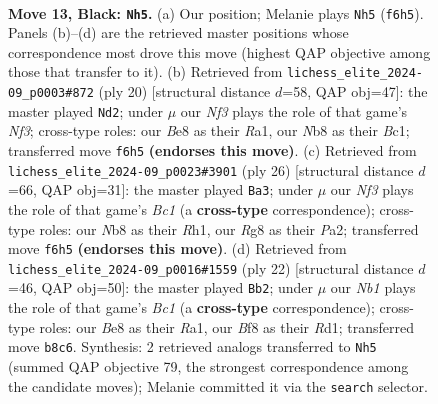 \documentclass[11pt]{article}
\begin{document}
\begin{figure}[p]
\label{fig:thought-m23}
\end{figure}

\clearpage

\begin{figure}[p]\centering
\begin{subfigure}{0.46\textwidth}\centering
\resizebox{\linewidth}{!}{%
\newchessgame
\chessboard[
  setfen={rn2bbr1/1p2kppp/p3pn2/2P5/P1B5/2NNPP2/1P4PP/R1B2RK1 b - - 2 13},
  showmover=false,
  pgfstyle=straightmove, color=movearrow, markmove={f6-h5}
]}
\caption{}
\end{subfigure}\hfill
\begin{subfigure}{0.46\textwidth}\centering
\resizebox{\linewidth}{!}{%
\newchessgame
\chessboard[
  setfen={rnb4r/4kppp/p3pn2/1pb5/8/2N1PN2/PP2BPPP/R1B2RK1 w - - 0 11},
  showmover=false,
  pgfstyle=straightmove, color=movearrow, markmove={f3-d2}
]}
\caption{}
\end{subfigure}
\\[4pt]
\begin{subfigure}{0.46\textwidth}\centering
\resizebox{\linewidth}{!}{%
\newchessgame
\chessboard[
  setfen={r1bbk2r/pp2nppp/2pn4/3p4/5NP1/1PP2N2/P2PBP1P/R1B1K2R w KQkq - 1 14},
  showmover=false,
  pgfstyle=straightmove, color=movearrow, markmove={c1-a3}
]}
\caption{}
\end{subfigure}\hfill
\begin{subfigure}{0.46\textwidth}\centering
\resizebox{\linewidth}{!}{%
\newchessgame
\chessboard[
  setfen={r1b2rk1/5ppp/p1n1pn2/1pb5/8/1PN1PN2/P3BPPP/R1BR2K1 w - - 2 12},
  showmover=false,
  pgfstyle=straightmove, color=movearrow, markmove={c1-b2}
]}
\caption{}
\end{subfigure}
\caption{\textbf{Move 13, Black: \texttt{Nh5}.} (a) Our position; Melanie plays \texttt{Nh5} (\texttt{f6h5}). Panels (b)--(d) are the retrieved master positions whose correspondence most drove this move (highest QAP objective among those that transfer to it). (b) Retrieved from \texttt{lichess\_elite\_2024-09\_p0003\#872} (ply 20) [structural distance $d$=58, QAP obj=47]: the master played \texttt{Nd2}; under $\mu$ our \emph{Nf3} plays the role of that game's \emph{Nf3}; cross-type roles: our \emph{B}e8 as their \emph{R}a1, our \emph{N}b8 as their \emph{B}c1; transferred move \texttt{f6h5} \textbf{(endorses this move)}. (c) Retrieved from \texttt{lichess\_elite\_2024-09\_p0023\#3901} (ply 26) [structural distance $d$=66, QAP obj=31]: the master played \texttt{Ba3}; under $\mu$ our \emph{Nf3} plays the role of that game's \emph{Bc1} (a \textbf{cross-type} correspondence); cross-type roles: our \emph{N}b8 as their \emph{R}h1, our \emph{R}g8 as their \emph{P}a2; transferred move \texttt{f6h5} \textbf{(endorses this move)}. (d) Retrieved from \texttt{lichess\_elite\_2024-09\_p0016\#1559} (ply 22) [structural distance $d$=46, QAP obj=50]: the master played \texttt{Bb2}; under $\mu$ our \emph{Nb1} plays the role of that game's \emph{Bc1} (a \textbf{cross-type} correspondence); cross-type roles: our \emph{B}e8 as their \emph{R}a1, our \emph{B}f8 as their \emph{R}d1; transferred move \texttt{b8c6}. Synthesis: 2 retrieved analogs transferred to \texttt{Nh5} (summed QAP objective 79, the strongest correspondence among the candidate moves); Melanie committed it via the \texttt{search} selector.}

\end{figure}
\end{document}
